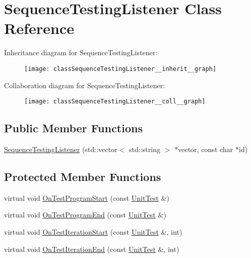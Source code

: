 \hypertarget{classSequenceTestingListener}{}\section{Sequence\+Testing\+Listener Class Reference}
\label{classSequenceTestingListener}


Inheritance diagram for Sequence\+Testing\+Listener\+:\nopagebreak
\begin{figure}[H]
\begin{center}
\leavevmode
\texttt{[image: classSequenceTestingListener\_\_inherit\_\_graph]}
\end{center}
\end{figure}


Collaboration diagram for Sequence\+Testing\+Listener\+:\nopagebreak
\begin{figure}[H]
\begin{center}
\leavevmode
\texttt{[image: classSequenceTestingListener\_\_coll\_\_graph]}
\end{center}
\end{figure}
\subsection*{Public Member Functions}
\begin{DoxyCompactItemize}
\item 
\hyperlink{classSequenceTestingListener_ac0fcb350d20876f8273621ad4c79ba7a}{Sequence\+Testing\+Listener} (std\+::vector$<$ std\+::string $>$ $\ast$vector, const char $\ast$id)
\end{DoxyCompactItemize}
\subsection*{Protected Member Functions}
\begin{DoxyCompactItemize}
\item 
virtual void \hyperlink{classSequenceTestingListener_a25b96acdbaa6f582e583e6b56bd39b42}{On\+Test\+Program\+Start} (const \hyperlink{classtesting_1_1UnitTest}{Unit\+Test} \&)
\item 
virtual void \hyperlink{classSequenceTestingListener_aacac5e15bac089460841ff63a5c31f57}{On\+Test\+Program\+End} (const \hyperlink{classtesting_1_1UnitTest}{Unit\+Test} \&)
\item 
virtual void \hyperlink{classSequenceTestingListener_a345641262fa10cc4b251ac54116db74b}{On\+Test\+Iteration\+Start} (const \hyperlink{classtesting_1_1UnitTest}{Unit\+Test} \&, int)
\item 
virtual void \hyperlink{classSequenceTestingListener_a783bc01e2a95f5bf73bbde4d96832e0f}{On\+Test\+Iteration\+End} (const \hyperlink{classtesting_1_1UnitTest}{Unit\+Test} \&, int)
\end{DoxyCompactItemize}


